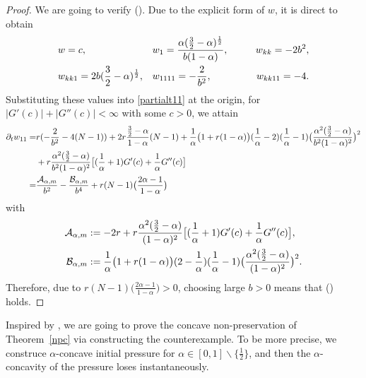 \documentclass[10pt]{article}         %
\numberwithin{equation}{section}
\begin{document}
\begin{proof}
We are going to verify (\expandafter{}).  Due to the explicit form of $w$,  it is direct to obtain  
\begin{align}
&w=c,         &&w_{1}=\frac{\alpha(\frac{3}{2}-\alpha)^{\frac{1}{2}}}{b(1-\alpha)},         &&&w_{kk}=-2b^2,\notag\\
&w_{kk1}=2b(\frac{3}{2}-\alpha)^{\frac{1}{2}},  &&w_{1111}=-\frac{2}{b^2},     &&&\ \ \ w_{kk11}=-4.\notag
\end{align}
Substituting these values into \eqref{partialt11} at the origin, for $|G'(c)|+|G''(c)|<\infty$ with some $c>0$, we attain
\begin{align}
\partial_t w_{11}=&r(-\frac{2}{b^2}-4(N-1))+2r\frac{\frac{3}{2}-\alpha}{1-\alpha}(N-1)\notag+\frac{1}{\alpha}\big(1+r(1-\alpha)\big)(\frac{1}{\alpha}-2)(\frac{1}{\alpha}-1)\big(\frac{\alpha^2(\frac{3}{2}-\alpha)}{b^2(1-\alpha)^2}\big)^{2}\notag\\
&+r\frac{\alpha^2(\frac{3}{2}-\alpha)}{b^2(1-\alpha)^2}\big[(\frac{1}{\alpha}+1)G'(c)+\frac{1}{\alpha}G''(c)\big]\notag\\
=&\frac{\mathcal{A}_{\alpha,m}}{b^2}-\frac{\mathcal{B}_{\alpha,m}}{b^4}+r(N-1)\big(\frac{2\alpha-1}{1-\alpha}\big)\notag
\end{align}
with \begin{align}\mathcal{A}_{\alpha,m}&:=-2r+r\frac{\alpha^2(\frac{3}{2}-\alpha)}{(1-\alpha)^2}\big[(\frac{1}{\alpha}+1)G'(c)+\frac{1}{\alpha}G''(c)\big],\notag\\
\mathcal{B}_{\alpha,m}&:=\frac{1}{\alpha}\big(1+r(1-\alpha)\big)(2-\frac{1}{\alpha})(\frac{1}{\alpha}-1)\big(\frac{\alpha^2(\frac{3}{2}-\alpha)}{(1-\alpha)^2}\big)^{2}.\notag\end{align}
Therefore, due to $r(N-1)\big(\frac{2\alpha-1}{1-\alpha})>0$, 
choosing large $b>0$ means that  (\expandafter{}) holds.
\end{proof}




Inspired by \cite{CW2024,ST2024}, we are going to prove the concave non-preservation of  Theorem~\ref{npc} via constructing the counterexample. To be more precise, we construce $\alpha$-concave  initial pressure for $\alpha\in[0,1]\backslash\{\frac{1}{2}\}$, and then the $\alpha$-concavity of the pressure loses instantaneously. 
\end{document}

